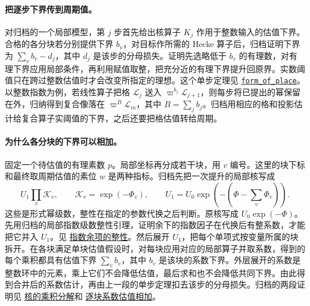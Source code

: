 \documentclass[UTF8,fontset=none,a4paper,11pt]{ctexart}
\theoremstyle{definition}
\newcommand{\src}[3]{\href{https://github.com/leanprover-community/riemann-hypothesis/blob/23aebbb302010b292314d406aa97f7901d698634/src/#1.lean\#L#2}{#3}}
\begin{document}
\paragraph{把逐步下界传到周期值。}
对归档的一个局部模型，第 $j$ 步首先给出核算子 $K_j$ 作用于整数输入的估值下界。合格的各分块若分别提供下界 $b_v$，对目标作所需的 Hecke 算子后，归档证明下界为 $\sum_v b_v-d_j$，其中 $d_j$ 是该步的分母损失。证明先选略低于 $b_v$ 的有理数，对有理下界应用局部条件，再利用赋值取整，把充分近的有理下界提升回原界。实数阈值只在跨过整数估值时才会改变所指定的理想。这个单步定理见
\src{Formalism/SharpRestriction/GrowthBounds/MultisetValuation/RamifiedLatticeOfChainEstimates}{90}{\texttt{form\_of\_place}}。
以整数指数为例，若线性算子把格 $\mathcal L_j$ 送入 $\varpi^{b_j}\mathcal L_{j+1}$，则每步将已提出的幂保留在外，归纳得到复合像落在 $\varpi^{B}\mathcal L_m$，其中 $B=\sum_j b_j$。归档用相应的格和投影估计给复合算子实阈值的下界，之后还要把格估值转给周期。

\paragraph{为什么各分块的下界可以相加。}
固定一个待估值的有理素数 $p$。局部坐标再分成若干块，用 $v$ 编号。这里的块下标和最终取周期估值的素位 $w$ 是两种指标。归档先把一次提升的局部核写成
\[
                   U_1\prod_v \mathcal K_v,\qquad
 \mathcal K_v=\exp(-\Phi_v),\qquad
 U_1=U_0\exp\!\left(-\left(\Phi-\sum_v\Phi_v\right)\right).
\]
这些是形式幂级数，整性在指定的参数代换之后判断。原核写成 $U_0\exp(-\Phi)$。先用归档的局部指数级数整性引理，证明余下的指数因子在代换后有整系数，才能把它并入 $U_1$。见 \src{Formalism/SharpRestriction/GrowthBounds/MultisetValuation/IntegralExpRename}{109}{指数余项的整性}。然后展开 $U_1$，把每个单项式按变量所属的块拆开。在各块满足单块估值假设时，对每块应用对应的局部算子并取系数，得到的每个乘积都具有估值下界 $\sum_v b_v$，其中 $b_v$ 是该块的系数下界。外层展开的系数是整数环中的元素，乘上它们不会降低估值，最后求和也不会降低共同下界。由此得到合并后的系数估计，再由上一段的单步定理扣去该步的分母损失。归档的两段证明见
\src{Formalism/SharpRestriction/GrowthBounds/MultisetValuation/RestEntOf}{20}{核的乘积分解}和
\src{Formalism/SharpRestriction/GrowthBounds/MultisetValuation/KernelProductForm}{51}{逐块系数估值相加}。
\end{document}
